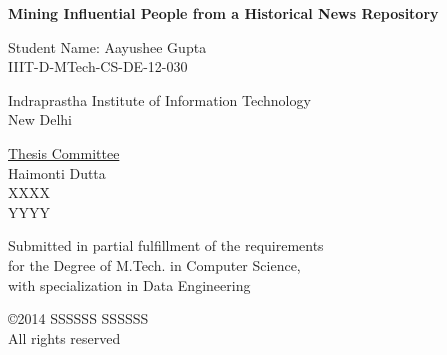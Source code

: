 
\def\addrone{Your address}
\def\addrtwo{Your city}

\def\degree{M.Tech. in Computer Science with Specialization in Data Engineering}


\def\submissiondate{April 01, 2014}

\def\supervisorone{Haimonti Dutta}

\def\supervisortwo{XXXX}

\def\supervisorthree{YYYY}





\thispagestyle{empty}

\begin{center}

{\LARGE \bf {Mining Influential People from a Historical News Repository }

 }  
 \vspace{.3in}
 
 {\Large{Student Name: Aayushee Gupta}} \\  
 \vspace{.1in} 
 IIIT-D-MTech-CS-DE-12-030 \\

  
    \vspace{.35in}

  \vspace{.25in}

{Indraprastha Institute of Information Technology\\
New Delhi}

\vspace{.35in}  {\underline{Thesis Committee} \\ \supervisorone         
   \\ \supervisortwo \\ \supervisorthree }\\ \vspace{.35in}


 {Submitted in partial fulfillment of the requirements \\for the Degree of M.Tech. in Computer Science, \\ with specialization in Data Engineering}

\vspace{.2in}

\copyright 2014 SSSSSS SSSSSS \\ All rights reserved \\
\vspace{.8in}


\end{center}
